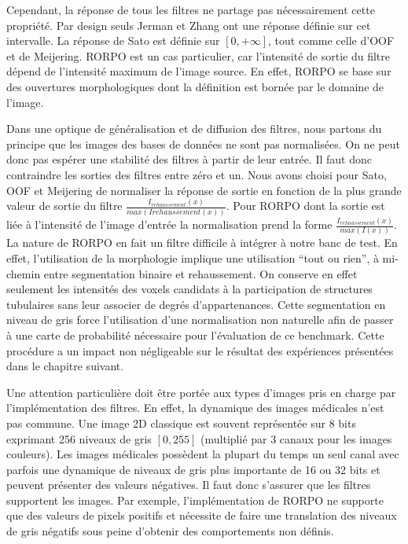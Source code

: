 Cependant, la réponse de tous les filtres ne partage pas nécessairement cette propriété. Par design seuls Jerman et Zhang ont une réponse définie sur cet intervalle. La réponse de Sato est définie sur $[0,+\infty]$, tout comme celle d'OOF et de Meijering. RORPO est un cas particulier, car l'intensité de sortie du filtre dépend de l'intensité maximum de l'image source. En effet, RORPO se base sur des ouvertures morphologiques dont la définition est bornée par le domaine de l'image. 

Dans une optique de généralisation et de diffusion des filtres, nous partons du principe que les images des bases de données ne sont pas normalisées. On ne peut donc pas espérer une stabilité des filtres à partir de leur entrée. Il faut donc contraindre les sorties des filtres entre zéro et un. Nous avons choisi pour Sato, OOF et Meijering de normaliser la réponse de sortie en fonction de la plus grande valeur de sortie du filtre $ \frac{I_{rehaussement}(x)} {max(I{rehaussement}(x))} $. Pour RORPO dont la sortie est liée à l'intensité de l'image d'entrée la normalisation prend la forme $ \frac{I_{rehaussement}(x)} {max(I(x))} $.
La nature de RORPO en fait un filtre difficile à intégrer à notre banc de test. En effet, l'utilisation de la morphologie implique une utilisation ``tout ou rien'', à mi-chemin entre segmentation binaire et rehaussement. On conserve en effet seulement les intensités des voxels candidats à la participation de structures tubulaires sans leur associer de degrés d'appartenances. Cette segmentation en niveau de gris force l'utilisation d'une normalisation non naturelle afin de passer à une carte de probabilité nécessaire pour l'évaluation de ce benchmark. Cette procédure a un impact non négligeable sur le résultat des expériences présentées dans le chapitre suivant.

Une attention particulière doit être portée aux types d'images pris en charge par l'implémentation des filtres. En effet, la dynamique des images médicales n'est pas commune. Une image 2D classique est souvent représentée sur 8 bits exprimant 256 niveaux de gris $[0,255]$ (multiplié par 3 canaux pour les images couleurs). Les images médicales possèdent la plupart du temps un seul canal avec parfois une dynamique de niveaux de gris plus importante de 16 ou 32 bits et peuvent présenter des valeurs négatives. Il faut donc s'assurer que les filtres supportent les images. Par exemple, l'implémentation de RORPO ne supporte que des valeurs de pixels positifs et nécessite de faire une translation des niveaux de gris négatifs sous peine d'obtenir des comportements non définis.

